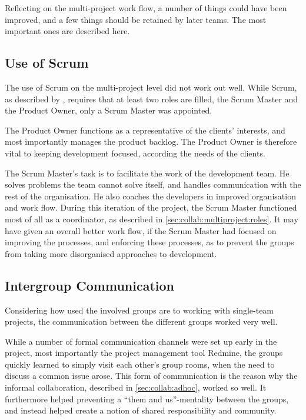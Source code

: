 Reflecting on the multi-project work flow, a number of things could have been improved, and a few things should be retained by later teams. 
The most important ones are described here.

\subsection{Use of Scrum}
\label{sec:eval:multiproject:scrum}
The use of Scrum on the multi-project level did not work out well. 
While Scrum, as described by \citet{scrumGuide}, requires that at least two roles are filled, the Scrum Master and the Product Owner, only a Scrum Master was appointed. 

The Product Owner functions as a representative of the clients' interests, and most importantly manages the product backlog. 
The Product Owner is therefore vital to keeping development focused, according the needs of the clients.

The Scrum Master's task is to facilitate the work of the development team. 
He solves problems the team cannot solve itself, and handles communication with the rest of the organisation. 
He also coaches the developers in improved organisation and work flow. 
During this iteration of the \giraf project, the Scrum Master functioned most of all as a coordinator, as described in \cref{sec:collab:multiproject:roles}. 
It may have given an overall better work flow, if the Scrum Master had focused on improving the processes, and enforcing these processes, as to prevent the groups from taking more disorganised approaches to development.

\subsection{Intergroup Communication}
Considering how used the involved groups are to working with single-team projects, the communication between the different groups worked very well. 

While a number of formal communication channels were set up early in the project, most importantly the project management tool Redmine, the groups quickly learned to simply visit each other's group rooms, when the need to discuss a common issue arose.
This form of communication is the reason why the informal collaboration, described in \cref{sec:collab:adhoc}, worked so well.
It furthermore helped preventing a ``them and us''-mentality between the groups, and instead helped create a notion of shared responsibility and community. 